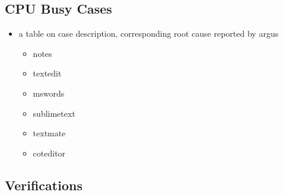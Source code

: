 \subsection{CPU Busy Cases}
\begin{itemize}
\item  a table on case description, corresponding root cause reported by argus
	\begin{itemize}
	\item notes
	\item textedit
	\item mswords
	\item sublimetext
	\item textmate
	\item coteditor
	\end{itemize}
\end{itemize}

\subsection{Verifications}

